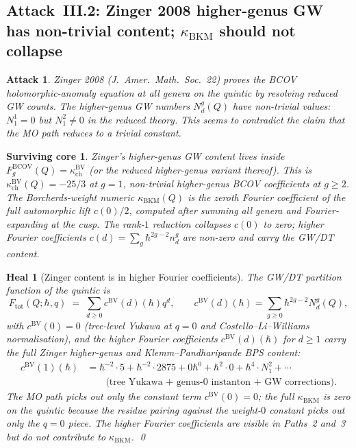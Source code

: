 \documentclass[11pt]{amsart}
\newtheorem{attack}[theorem]{Attack}
\newtheorem{surviving}[theorem]{Surviving core}
\newtheorem{heal}[theorem]{Heal}
\providecommand{\BV}{\mathrm{BV}}
\providecommand{\kBKM}{\kappa_{\mathrm{BKM}}}
\providecommand{\kch}{\kappa_{\mathrm{ch}}}
\begin{document}
\subsection{Attack~III.2: Zinger 2008 higher-genus GW has
non-trivial content; $\kBKM$ should not collapse}

\begin{attack}
\label{att:zinger-higher-genus}
Zinger 2008 (\textit{J.\ Amer.\ Math.\ Soc.}~22) proves the BCOV
holomorphic-anomaly equation at all genera on the quintic by
resolving reduced GW counts. The higher-genus GW numbers
$N^g_d(Q)$ have non-trivial values: $N^1_1 = 0$ but $N^2_1 \neq 0$
in the reduced theory. This seems to contradict the claim that the
MO path reduces to a trivial constant.
\end{attack}

\begin{surviving}
\label{surv:zinger-vs-kbkm}
Zinger's higher-genus GW content lives inside $F_g^{\mathrm{BCOV}}(Q)
= \kch^{\BV}$ (or the reduced higher-genus variant thereof). This
is $\kch^{\BV}(Q) = -25/3$ at $g = 1$, non-trivial higher-genus
BCOV coefficients at $g \geq 2$. The Borcherds-weight numeric
$\kBKM(Q)$ is the zeroth Fourier coefficient of the full automorphic
lift $c(0)/2$, computed after summing all genera and Fourier-expanding
at the cusp. The rank-$1$ reduction collapses $c(0)$ to zero;
higher Fourier coefficients $c(d) = \sum_g \hbar^{2g - 2} n^g_d$
are non-zero and carry the GW/DT content.
\end{surviving}

\begin{heal}[Zinger content is in higher Fourier coefficients]
\label{heal:zinger-in-higher-fourier}
The GW/DT partition function of the quintic is
\[
F_{\mathrm{tot}}(Q; \hbar, q) \;=\;
\sum_{d \geq 0} c^{\BV}(d)(\hbar) q^d,
\qquad c^{\BV}(d)(\hbar) = \sum_{g \geq 0} \hbar^{2g-2} N^g_d(Q),
\]
with $c^{\BV}(0) = 0$ (tree-level Yukawa at $q = 0$ and
Costello--Li--Williams normalisation), and the higher Fourier
coefficients $c^{\BV}(d)(\hbar)$ for $d \geq 1$ carry the full
Zinger higher-genus and Klemm--Pandharipande BPS content:
\begin{align*}
c^{\BV}(1)(\hbar) &= \hbar^{-2} \cdot 5 + \hbar^{-2} \cdot 2875 + 0 \hbar^0
 + \hbar^2 \cdot 0 + \hbar^4 \cdot N^2_1 + \cdots \\
&\qquad \text{(tree Yukawa + genus-$0$ instanton + GW corrections)}.
\end{align*}
The MO path picks out only the constant term $c^{\BV}(0) = 0$;
the full $\kBKM$ is zero on the quintic because the residue pairing
against the weight-$0$ constant picks out only the $q = 0$ piece.
The higher Fourier coefficients are visible in Paths~2 and~3 but
do not contribute to $\kBKM$.
\qed
\end{heal}
\end{document}
